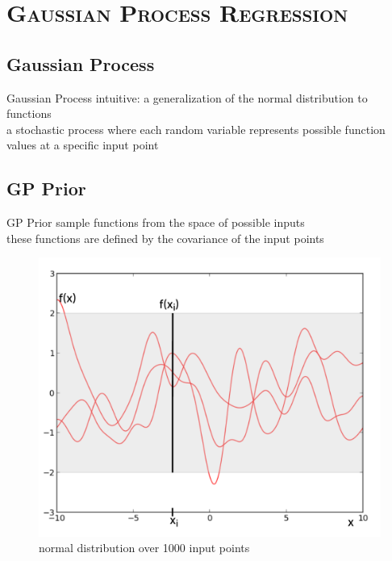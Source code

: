 \documentclass[xcolor=x11names,compress]{beamer}
\begin{document}
    \section{\scshape Gaussian Process Regression}
    \subsection{Gaussian Process}
    \begin{frame}{Gaussian Process}
        intuitive: a generalization of the normal distribution to functions\\
        \bigskip
        a stochastic process where each random variable represents possible function values at a specific input point
    \end{frame}

    \subsection{GP Prior}
    \begin{frame}{GP Prior}
        sample functions from the space of possible inputs\\
        these functions are defined by the covariance of the input points\\
        \begin{figure}
            \centering
            \includegraphics[width=.6\textwidth]{../resources/figures/gp_prior_new.pdf}
            \caption{normal distribution over 1000 input points}
        \end{figure}

    \end{frame}

\end{document}
